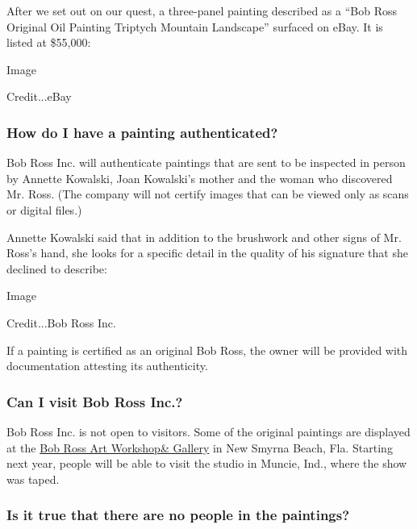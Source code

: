 After we set out on our quest, a three-panel painting described as a
``Bob Ross Original Oil Painting Triptych Mountain Landscape'' surfaced
on eBay. It is listed at \$55,000:

Image

Credit...eBay

\hypertarget{how-do-i-have-a-painting-authenticated-}{%
\subsubsection{\texorpdfstring{\textbf{How do I have a painting
authenticated?}
}{How do I have a painting authenticated? }}\label{how-do-i-have-a-painting-authenticated-}}

Bob Ross Inc. will authenticate paintings that are sent to be inspected
in person by Annette Kowalski, Joan Kowalski's mother and the woman who
discovered Mr. Ross. (The company will not certify images that can be
viewed only as scans or digital files.)

Annette Kowalski said that in addition to the brushwork and other signs
of Mr. Ross's hand, she looks for a specific detail in the quality of
his signature that she declined to describe:

Image

Credit...Bob Ross Inc.

If a painting is certified as an original Bob Ross, the owner will be
provided with documentation attesting its authenticity.

\hypertarget{can-i-visit-bob-ross-inc}{%
\subsubsection{\texorpdfstring{\textbf{Can I visit Bob Ross
Inc.?}}{Can I visit Bob Ross Inc.?}}\label{can-i-visit-bob-ross-inc}}

Bob Ross Inc. is not open to visitors. Some of the original paintings
are displayed at the \href{https://www.bobrossartworkshop.com/}{Bob Ross
Art Workshop}\href{https://www.bobrossartworkshop.com/}{\& Gallery} in
New Smyrna Beach, Fla. Starting next year, people will be able to visit
the studio in Muncie, Ind., where the show was taped.

\hypertarget{is-it-true-that-there-are-no-people-in-the-paintings}{%
\subsubsection{\texorpdfstring{\textbf{Is it true that there are no
people in the
paintings?}}{Is it true that there are no people in the paintings?}}\label{is-it-true-that-there-are-no-people-in-the-paintings}}

